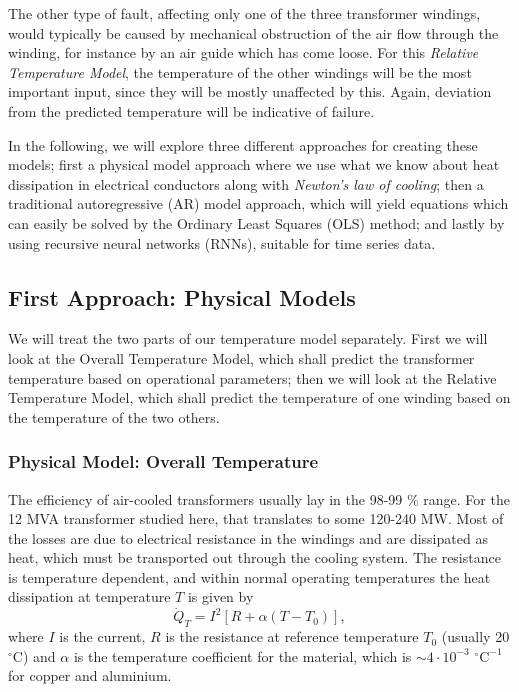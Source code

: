\documentclass[]{article}
\begin{document}
The other type of fault, affecting only one of the three transformer windings, would typically be caused by mechanical obstruction of the air flow through the winding, for instance by an air guide which has come loose. For this \textit{Relative Temperature Model}, the temperature of the other windings will be the most important input, since they will be mostly unaffected by this. Again, deviation from the predicted temperature will be indicative of failure.

In the following, we will explore three different approaches for creating these models; first a physical model approach where we use what we know about heat dissipation in electrical conductors along with \textit{Newton's law of cooling}; then a traditional autoregressive (AR) model approach, which will yield equations which can easily be solved by the Ordinary Least Squares (OLS) method; and lastly by using recursive neural networks (RNNs), suitable for time series data.

\subsection{First Approach: Physical Models} \label{sec:physical-model}
We will treat the two parts of our temperature model separately. First we will look at the Overall Temperature Model, which shall predict the transformer temperature based on operational parameters; then we will look at the Relative Temperature Model, which shall predict the temperature of one winding based on the temperature of the two others.

\subsubsection{Physical Model: Overall Temperature} \label{sec:physical-model-overall}
The efficiency of air-cooled transformers usually lay in the 98-99 \% range. For the 12 MVA transformer studied here, that translates to some 120-240 MW. Most of the losses are due to electrical resistance in the windings and are dissipated as heat, which must be transported out through the cooling system. The resistance is temperature dependent, and within normal operating temperatures the heat dissipation at temperature $T$ is given by
\begin{equation}
\dot{Q}_T = I^2 [R + \alpha(T - T_0)],
\end{equation}
where $I$ is the current, $R$ is the resistance at reference temperature $T_0$ (usually 20 $^\circ$C) and $\alpha$ is the temperature coefficient for the material, which is $\sim 4 \cdot 10^{-3}$ $^\circ \text{C}^{-1}$ for copper and aluminium. 
\end{document}
